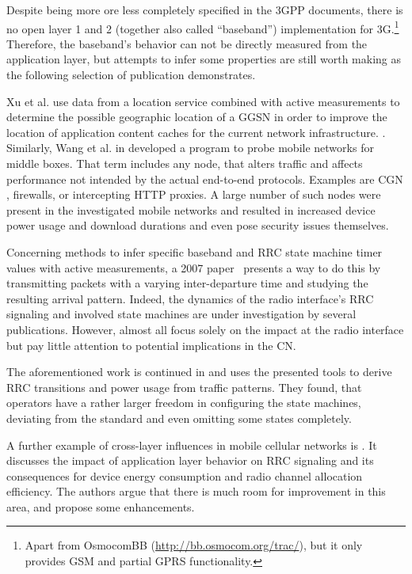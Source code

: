 Despite being more ore less completely specified in the \gls{3GPP} documents, there is no open layer 1 and 2 (together also called ``baseband'') implementation for \gls{3G}.\footnote{Apart from OsmocomBB (\url{http://bb.osmocom.org/trac/}), but it only provides \gls{GSM} and partial \gls{GPRS} functionality.} Therefore, the baseband's behavior can not be directly measured from the application layer, but attempts to infer some properties are still worth making as the following selection of publication demonstrates.

Xu et al. use data from a location service combined with active measurements to determine the possible geographic location of a \gls{GGSN} in order to improve the location of application content caches for the current network infrastructure. \cite{Xu:2011:CDN:2007116.2007149}. Similarly, Wang et al. in \cite{sigcomm11middleboxes} developed a program to probe mobile networks for middle boxes. That term includes any node, that alters traffic and affects performance not intended by the actual end-to-end protocols. Examples are \gls{CGN} \cite{rfc7021}, firewalls, or intercepting \gls{HTTP} proxies. A large number of such nodes were present in the investigated mobile networks and resulted in increased device power usage and download durations and even pose security issues themselves.

Concerning methods to infer specific baseband and \gls{RRC} state machine timer values with active measurements, a 2007 paper~\cite{4640935} presents a way to do this by transmitting packets with a varying inter-departure time and studying the resulting arrival pattern. Indeed, the dynamics of the radio interface's \gls{RRC} signaling and involved state machines are under investigation by several publications. However, almost all focus solely on the impact at the radio interface but pay little attention to potential implications in the \gls{CN}.

The aforementioned work is continued in \cite{5360763} and uses the presented tools to derive \gls{RRC} transitions and power usage from traffic patterns. They found, that operators have a rather larger freedom in configuring the state machines, deviating from the standard and even omitting some states completely.

A further example of cross-layer influences in mobile cellular networks is \cite{qian2011profiling}. It discusses the impact of application layer behavior on \gls{RRC} signaling and its consequences for device energy consumption and radio channel allocation efficiency. The authors argue that there is much room for improvement in this area, and propose some enhancements.

